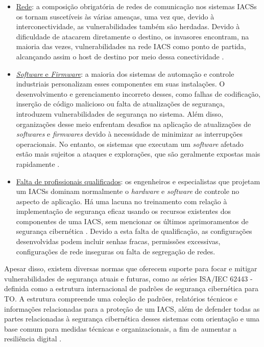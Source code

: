     \begin{itemize}
        \item \underline{Rede}: a composição obrigatória de redes de comunicação nos sistemas IACSs os tornam suscetíveis às várias ameaças, uma vez que, devido à interconectividade, as vulnerabilidades também são herdadas. Devido à dificuldade de atacarem diretamente o destino, os invasores encontram, na maioria das vezes, vulnerabilidades na rede IACS como ponto de partida, alcançando assim o host de destino por meio dessa conectividade \cite{li2020}.
        \item \underline{\textit{Software} e \textit{Firmware}}: a maioria dos sistemas de automação e controle industriais personalizam esses componentes em suas instalações. O desenvolvimento e gerenciamento incorreto desses, como falhas de codificação, inserção de código malicioso ou falta de atualizações de segurança, introduzem vulnerabilidades de segurança no sistema. Além disso, organizações desse meio enfrentam desafios na aplicação de atualizações de \textit{softwares} e \textit{firmwares} devido à necessidade de minimizar as interrupções operacionais. No entanto, os sistemas que executam um \textit{software} afetado estão mais sujeitos a ataques e explorações, que são geralmente expostas mais rapidamente \cite{maidl2021}.
        \item \underline{Falta de profissionais qualificados}: os engenheiros e especialistas que projetam um IACSs dominam normalmente o \textit{hardware} e \textit{software} de controle no aspecto de aplicação. Há uma lacuna no treinamento com relação à implementação de segurança eficaz usando os recursos existentes dos componentes de uma IACS, sem mencionar os últimos aprimoramentos de segurança cibernética \cite{graham2016}. Devido a esta falta de qualificação, as configurações desenvolvidas podem incluir senhas fracas, permissões excessivas, configurações de rede inseguras ou falta de segregação de redes.
    \end{itemize}

    Apesar disso, existem diversas normas que oferecem suporte para focar e mitigar vulnerabilidades de segurança atuais e futuras, como as séries ISA/IEC 62443 - definida como a estrutura internacional de padrões de segurança cibernética para TO. A estrutura compreende uma coleção de padrões, relatórios técnicos e informações relacionadas para a proteção de um IACS, além de defender todas as partes relacionadas à segurança cibernética desses sistemas com orientação e uma base comum para medidas técnicas e organizacionais, a fim de aumentar a resiliência digital \cite{wiboonrat2022}. 

